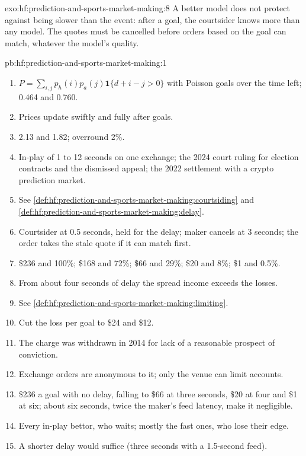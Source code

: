\begin{solution}{exo:hf:prediction-and-sports-market-making:8}
A better model does not protect against being slower than the event: after a goal, the courtsider knows more than any model. The quotes must be
cancelled before orders based on the goal can match, whatever the model's quality.
\end{solution}

\begin{solution}{pb:hf:prediction-and-sports-market-making:1}
\begin{enumerate}
\item $P=\sum_{i,j}p_h(i)p_a(j)\mathbf 1\{d+i-j>0\}$ with Poisson goals over the time left; 0.464 and 0.760.
\item Prices update swiftly and fully after goals.
\item 2.13 and 1.82; overround 2\%.
\item In-play  of 1 to 12 seconds on one exchange; the 2024 court ruling for election contracts and the dismissed appeal; the 2022
settlement with a crypto prediction market.
\item See \cref{def:hf:prediction-and-sports-market-making:courtsiding} and \cref{def:hf:prediction-and-sports-market-making:delay}.
\item Courtsider at 0.5 seconds, held for the delay; maker cancels at 3 seconds; the order takes the stale quote if it can match first.
\item \$236 and 100\%; \$168 and 72\%; \$66 and 29\%; \$20 and 8\%; \$1 and 0.5\%.
\item From about four seconds of delay the spread income exceeds the losses.
\item See \cref{def:hf:prediction-and-sports-market-making:limiting}.
\item Cut the loss per goal to \$24 and \$12.
\item The charge was withdrawn in 2014 for lack of a reasonable prospect of conviction.
\item Exchange orders are anonymous to it; only the venue can limit accounts.
\item \$236 a goal with no delay, falling to \$66 at three seconds, \$20 at four and \$1 at six; about six seconds, twice the maker's feed latency,
make it negligible.
\item Every in-play bettor, who waits; mostly the fast ones, who lose their edge.
\item A shorter delay would suffice (three seconds with a 1.5-second feed).

\end{enumerate}
\end{solution}
